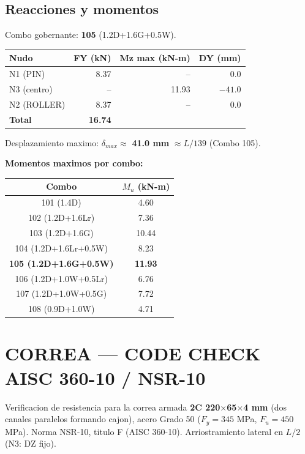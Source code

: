 \documentclass[12pt,a4paper]{article}
\newcommand{\tableheadrow}{\rowcolor{primary!15}\sffamily\footnotesize\bfseries\color{primary}}
\newcommand{\tabletotalrow}{\rowcolor{secondary!10}\sffamily\bfseries}
\begin{document}
\subsection{Reacciones y momentos}
Combo gobernante: \textbf{105} (1.2D+1.6G+0.5W).

\begin{center}
\begin{tabular}{l r r r}
\toprule
\tableheadrow
\textbf{Nudo} & \textbf{FY (kN)} & \textbf{Mz max (kN-m)} & \textbf{DY (mm)} \\
\midrule
N1 (PIN)   & 8.37 & -- & 0.0 \\
\rowcolor{tablerow}
N3 (centro) & -- & 11.93 & $-41.0$ \\
N2 (ROLLER) & 8.37 & -- & 0.0 \\
\midrule
\tabletotalrow
\textbf{Total} & \textbf{16.74} & & \\
\bottomrule
\end{tabular}
\end{center}

Desplazamiento maximo: $\delta_{max} \approx$ \textbf{41.0 mm} $\approx L / 139$ (Combo 105).

\textbf{Momentos maximos por combo:}
\begin{center}
\begin{tabular}{c c}
\toprule
\tableheadrow
\textbf{Combo} & \textbf{$M_u$ (kN-m)} \\
\midrule
101 (1.4D)        &  4.60 \\
102 (1.2D+1.6Lr)  &  7.36 \\
\rowcolor{tablerow}
103 (1.2D+1.6G)   & 10.44 \\
104 (1.2D+1.6Lr+0.5W) & 8.23 \\
\rowcolor{tablerow}
\textbf{105 (1.2D+1.6G+0.5W)} & \textbf{11.93} \\
106 (1.2D+1.0W+0.5Lr) & 6.76 \\
\rowcolor{tablerow}
107 (1.2D+1.0W+0.5G) & 7.72 \\
108 (0.9D+1.0W)    & 4.71 \\
\bottomrule
\end{tabular}
\end{center}

\section{CORREA --- CODE CHECK AISC 360-10 / NSR-10}
Verificacion de resistencia para la correa armada \textbf{2C 220$\times$65$\times$4 mm}
(dos canales paralelos formando cajon), acero Grado 50 ($F_y=345$ MPa, $F_u=450$ MPa).
Norma NSR-10, titulo F (AISC 360-10). Arriostramiento lateral en $L/2$ (N3: DZ fijo).
\end{document}
